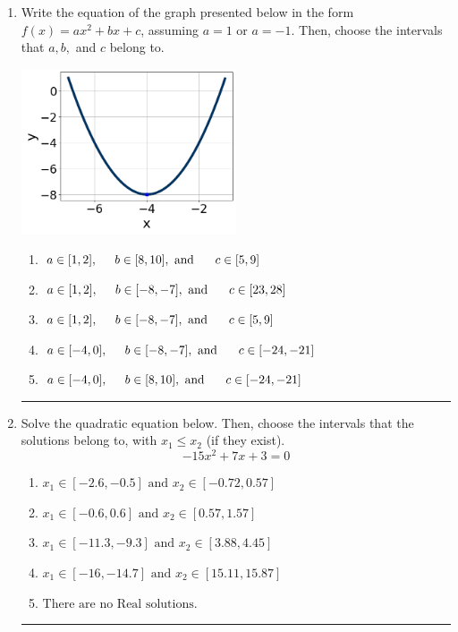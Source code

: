 \documentclass[14pt]{extbook}
\newcommand{\litem}[1]{\item#1\hspace*{-1cm}\rule{\textwidth}{0.4pt}}
\begin{document}
\begin{enumerate}
\litem{
Write the equation of the graph presented below in the form $f(x)=ax^2+bx+c$, assuming  $a=1$ or $a=-1$. Then, choose the intervals that $a, b,$ and $c$ belong to.
\begin{center}
    \includegraphics[width=0.5\textwidth]{../Figures/quadraticGraphToEquationC.png}
\end{center}
\begin{enumerate}[label=\Alph*.]
\item \( a \in [1, 2], \hspace*{5mm} b \in [8, 10], \text{ and } \hspace*{5mm} c \in [5, 9] \)
\item \( a \in [1, 2], \hspace*{5mm} b \in [-8, -7], \text{ and } \hspace*{5mm} c \in [23, 28] \)
\item \( a \in [1, 2], \hspace*{5mm} b \in [-8, -7], \text{ and } \hspace*{5mm} c \in [5, 9] \)
\item \( a \in [-4, 0], \hspace*{5mm} b \in [-8, -7], \text{ and } \hspace*{5mm} c \in [-24, -21] \)
\item \( a \in [-4, 0], \hspace*{5mm} b \in [8, 10], \text{ and } \hspace*{5mm} c \in [-24, -21] \)

\end{enumerate} }
\litem{
Solve the quadratic equation below. Then, choose the intervals that the solutions belong to, with $x_1 \leq x_2$ (if they exist).\[ -15x^{2} +7 x + 3 = 0 \]\begin{enumerate}[label=\Alph*.]
\item \( x_1 \in [-2.6, -0.5] \text{ and } x_2 \in [-0.72, 0.57] \)
\item \( x_1 \in [-0.6, 0.6] \text{ and } x_2 \in [0.57, 1.57] \)
\item \( x_1 \in [-11.3, -9.3] \text{ and } x_2 \in [3.88, 4.45] \)
\item \( x_1 \in [-16, -14.7] \text{ and } x_2 \in [15.11, 15.87] \)
\item \( \text{There are no Real solutions.} \)


\end{enumerate}}
\end{enumerate}
\end{document}
